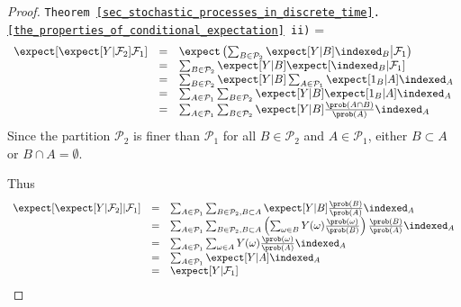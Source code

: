 \documentclass[11pt,a4paper]{article}
\begin{document}
  \begin{proof}{\texttt{Theorem \ref{sec_stochastic_processes_in_discrete_time}.\ref{the_properties_of_conditional_expectation} ii)}}
    \everymath={\displaystyle}
    \[\begin{array}{rcl}
      \expect[\expect[Y|\mathcal{F}_2]\mathcal{F}_1]&=&\expect\left(\sum_{B\in\mathcal{P}_2}\expect[Y|B]\indexed_B\big|\mathcal{F}_1\right)\\
      &=&\sum_{B\in\mathcal{P}_2}\expect[Y|B]\expect[\indexed_B|\mathcal{F}_1]\\
      &=&\sum_{B\in\mathcal{P}_2}\expect[Y|B]\sum_{A\in\mathcal{P}_1}\expect[1_B|A]\indexed_A\\
      &=&\sum_{A\in\mathcal{P}_1}\sum_{B\in\mathcal{P}_2}\expect[Y|B]\expect[1_B|A]\indexed_A\\
      &=&\sum_{A\in\mathcal{P}_1}\sum_{B\in\mathcal{P}_2}\expect[Y|B]\frac{\prob(A\cap B)}{\prob(A)}\indexed_A\\
    \end{array}\]
    Since the partition $\mathcal{P}_2$ is finer than $\mathcal{P}_1$  for all $B\in\mathcal{P}_2$ and $A\in\mathcal{P}_1$, either $B\subset A$ or $B\cap A=\emptyset$.
    \par Thus
    \[\begin{array}{rcl}
      \expect[\expect[Y|\mathcal{F}_2]|\mathcal{F}_1]&=&\sum_{A\in\mathcal{P}_1}\sum_{B\in\mathcal{P}_2,B\subset A}\expect[Y|B]\frac{\prob(B)}{\prob(A)}\indexed_A\\
      &=&\sum_{A\in\mathcal{P}_1}\sum_{B\in\mathcal{P}_2,B\subset A}\left(\sum_{\omega\in B}Y(\omega)\frac{\prob(\omega)}{\prob(B)}\right)\frac{\prob(B)}{\prob(A)}\indexed_A\\
      &=&\sum_{A\in\mathcal{P}_1}\sum_{\omega\in A}Y(\omega)\frac{\prob(\omega)}{\prob(A)}\indexed_A\\
      &=&\sum_{A\in\mathcal{P}_1}\expect[Y|A]\indexed_A\\
      &=&\expect[Y|\mathcal{F}_1]
    \end{array}\]
    \proved
  \end{proof}
\end{document}
